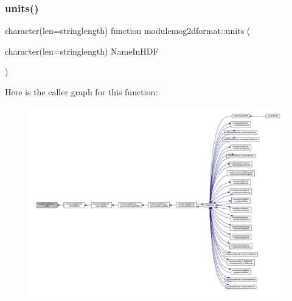\mbox{\label{namespacemodulemog2dformat_aa554861ca3342b570e56692003d31785}} 
\subsubsection{\texorpdfstring{units()}{units()}}
{\footnotesize\ttfamily character(len=stringlength) function modulemog2dformat\+::units (\begin{DoxyParamCaption}\item[{character(len=stringlength)}]{Name\+In\+H\+DF }\end{DoxyParamCaption})\hspace{0.3cm}{\ttfamily [private]}}

Here is the caller graph for this function\+:\nopagebreak
\begin{figure}[H]
\begin{center}
\leavevmode
\includegraphics[width=350pt]{namespacemodulemog2dformat_aa554861ca3342b570e56692003d31785_icgraph}
\end{center}
\end{figure}
\mbox{\label{namespacemodulemog2dformat_acbf2158af081eb0e8e9996387d7dfd5f}} 
